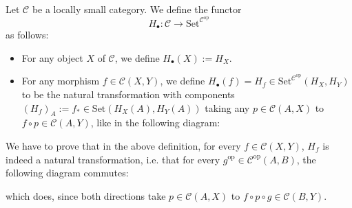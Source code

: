 \begin{definition}[4.1.21]\label{def:functor} Let $\mathcal{C}$ be a locally small category. We define the functor
\[H_{\bullet}:\mathcal{C}\to\mathrm{Set}^{\mathcal{C}^{\mathrm{op}}}\]
as follows:
\begin{itemize}
\item For any object $X$ of $\mathcal{C}$, we define $H_{\bullet}(X):=H_X$.
\item For any morphism $f\in\mathcal{C}(X,Y)$, we define $H_{\bullet}(f)=H_f\in\mathrm{Set}^{\mathcal{C}^{\mathrm{op}}}(H_X,H_Y)$ to be the natural transformation with components $(H_f)_A:=f_*\in\mathrm{Set}(H_X(A),H_Y(A))$ taking any $p\in\mathcal{C}(A,X)$ to $f\circ p\in\mathcal{C}(A,Y)$, like in the following diagram:
\begin{center}
\end{center}
\end{itemize}
\end{definition}
\begin{remark} We have to prove that in the above definition, for every $f\in\mathcal{C}(X,Y)$, $H_f$ is indeed a natural transformation, i.e. that for every $g^{\mathrm{op}}\in\mathcal{C}^{\mathrm{op}}(A,B)$, the following diagram commutes:
\begin{center}
\end{center}
which does, since both directions take $p\in\mathcal{C}(A,X)$ to $f\circ p\circ g\in\mathcal{C}(B,Y)$.
\end{remark}

